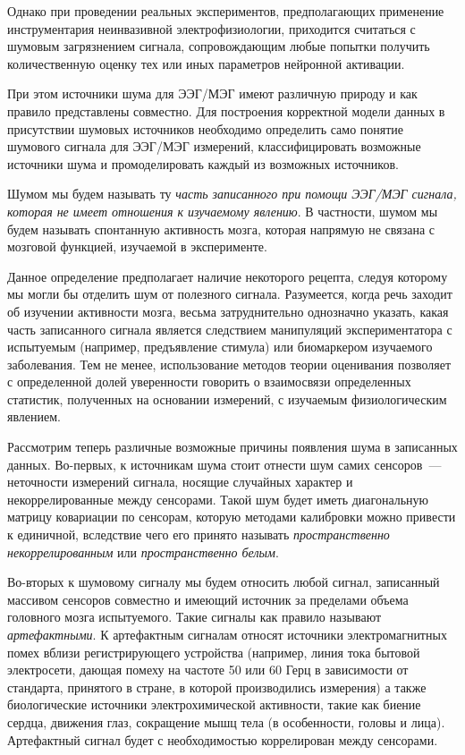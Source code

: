Однако при проведении реальных экспериментов, предполагающих применение инструментария неинвазивной электрофизиологии,
приходится считаться с шумовым загрязнением сигнала, сопровождающим любые попытки получить количественную оценку тех
или иных параметров нейронной активации.

При этом источники шума для ЭЭГ/МЭГ имеют различную природу и как правило представлены совместно.
Для построения корректной модели данных в присутствии шумовых источников необходимо определить
само понятие шумового сигнала для ЭЭГ/МЭГ измерений, классифицировать возможные источники шума и
промоделировать каждый из возможных источников.

Шумом мы будем называть ту
\emph{часть записанного при помощи ЭЭГ/МЭГ сигнала, которая не имеет отношения к изучаемому явлению}.
В частности, шумом мы будем называть спонтанную активность мозга, которая напрямую не связана с мозговой
функцией, изучаемой в эксперименте.

Данное определение предполагает наличие некоторого рецепта,
следуя которому мы могли бы отделить шум от полезного сигнала.
Разумеется, когда речь заходит об изучении активности мозга, весьма затруднительно однозначно указать,
какая часть записанного сигнала является следствием манипуляций экспериментатора с испытуемым
(например, предъявление стимула) или биомаркером изучаемого заболевания.
Тем не менее, использование методов теории оценивания позволяет с определенной
долей уверенности говорить о взаимосвязи определенных статистик, полученных на основании
измерений, с изучаемым физиологическим явлением.

Рассмотрим теперь различные возможные причины появления шума в записанных данных.
Во-первых, к источникам шума стоит отнести шум самих сенсоров~--- неточности измерений сигнала,
носящие случайных характер и некоррелированные между сенсорами. Такой шум будет иметь диагональную
матрицу ковариации по сенсорам, которую методами калибровки можно привести к единичной,
вследствие чего его принято называть \emph{пространственно некоррелированным} или \emph{пространственно белым}.

Во-вторых к шумовому сигналу мы будем относить любой сигнал, записанный массивом сенсоров совместно и
имеющий источник за пределами объема головного мозга испытуемого. Такие сигналы как правило называют
\emph{артефактными}. К артефактным сигналам относят источники электромагнитных помех
вблизи регистрирующего устройства
(например, линия тока бытовой электросети,
дающая помеху на частоте 50 или 60 Герц в зависимости от стандарта,
принятого в стране, в которой производились измерения)
а также биологические источники электрохимической активности,
такие как биение сердца, движения глаз, сокращение мышц тела (в особенности, головы и лица).
Артефактный сигнал будет с необходимостью коррелирован между сенсорами.

